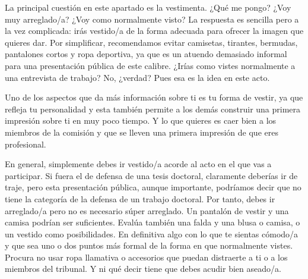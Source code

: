 La principal cuestión en este apartado es la vestimenta. ¿Qué me pongo? ¿Voy muy arreglado/a? ¿Voy como normalmente visto? La respuesta es sencilla pero a la vez complicada: irás vestido/a de la forma adecuada para ofrecer la imagen que quieres dar. Por simplificar, recomendamos evitar camisetas, tirantes, bermudas, pantalones cortos y ropa deportiva, ya que es un atuendo demasiado informal para una presentación pública de este calibre. ¿Irías como vistes normalmente a una entrevista de trabajo? No, ¿verdad? Pues esa es la idea en este acto. 

Uno de los aspectos que da más información sobre ti es tu forma de vestir, ya que refleja tu personalidad y esta también permite a los demás construir una primera impresión sobre ti en muy poco tiempo. Y lo que quieres es caer bien a los miembros de la comisión y que se lleven una primera impresión de que eres  profesional.

En general, simplemente debes ir vestido/a acorde al acto en el que vas a participar. Si fuera el de defensa de una tesis doctoral, claramente deberías ir de traje, pero esta presentación pública, aunque importante, podríamos decir que no tiene la categoría de la defensa de un trabajo doctoral. Por tanto, debes ir arreglado/a pero no es necesario súper arreglado. Un pantalón de vestir y una camisa podrían ser suficientes. Evalúa también una falda y una blusa o camisa, o un vestido como posibilidades. En definitiva algo con lo que te sientas cómodo/a y que sea uno o dos puntos más formal de la forma en que normalmente vistes. Procura no usar ropa llamativa o accesorios que puedan distraerte a ti o a los miembros del tribunal. Y ni qué decir tiene que debes acudir bien aseado/a.







